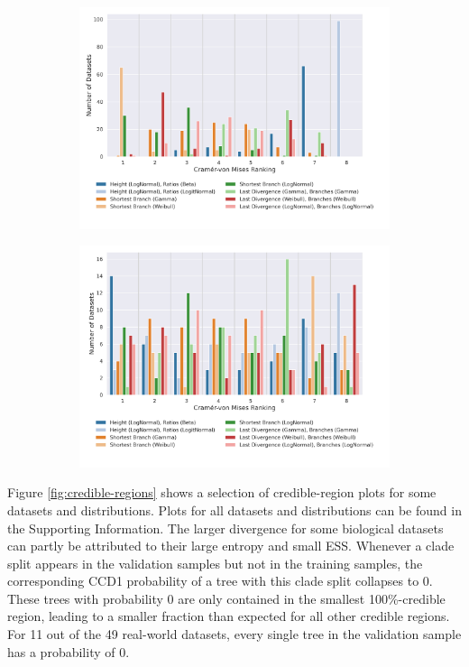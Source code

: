 \documentclass[10pt,letterpaper]{article}
\begin{document}
\begin{figure}
	\begin{subfigure}[b]{0.4\textwidth}
		\centering
		\includegraphics[width=\textwidth]{figures/yule-400-ccd1-cvm-ranking.png}
	\end{subfigure}
	\begin{subfigure}[b]{0.4\textwidth}
		\centering
		\includegraphics[width=\textwidth]{figures/bio-ccd1-cvm-ranking.png}
	\end{subfigure}
	
	\label{fig:cramer-von-mises-ranking}
\end{figure}

Figure \ref{fig:credible-regions} shows a selection of credible-region plots for some datasets and distributions. Plots for all datasets and distributions can be found in the Supporting Information. The larger divergence for some biological datasets can partly be attributed to their large entropy and small ESS. Whenever a clade split appears in the validation samples but not in the training samples, the corresponding CCD1 probability of a tree with this clade split collapses to $0$. These trees with probability $0$ are only contained in the smallest 100\%-credible region, leading to a smaller fraction than expected for all other credible regions. For 11 out of the 49 real-world datasets, every single tree in the validation sample has a probability of $0$.
\end{document}
